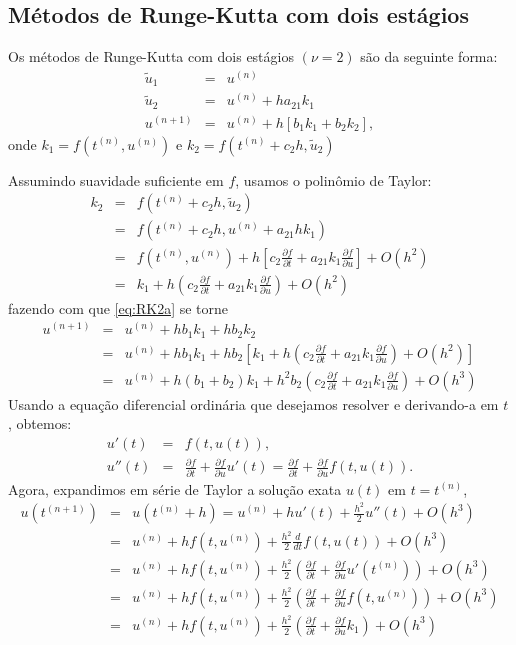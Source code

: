 \subsection{Métodos de Runge-Kutta com dois estágios}\label{eq:RK_2_subsec}
Os métodos de Runge-Kutta com dois estágios $\left(\nu=2\right)$ são da seguinte forma:
\begin{eqnarray}
  \tilde{u}_1 &=&u^{(n)} \\
  \tilde{u}_2 &=&u^{(n)}  + h a_{21}k_1 \\
  u^{(n+1)}&=&u^{(n)}  + h [ b_1k_1+b_2k_2],\label{eq:RK2a}
\end{eqnarray}
onde $k_1=f(t^{(n)},u^{(n)})$ e $k_2=f(t^{(n)}+c_2h,\tilde{u}_2)$

Assumindo suavidade suficiente em $f$, usamos o polinômio de Taylor:
\begin{eqnarray}
k_2 &=&f(t^{(n)}+c_2h, \tilde{u}_2)\\
   &=&f(t^{(n)}+c_2h, u^{(n)}+ a_{21}h k_1)\\
   &=&f(t^{(n)}, u^{(n)}) + h\left[c_2 \frac{\partial f}{\partial t}+ a_{21} k_1\frac{\partial f}{\partial u}\right]+O(h^2)\\
   &=&k_1 + h\left(c_2 \frac{\partial f}{\partial t}+ a_{21} k_1\frac{\partial f}{\partial u}\right)+O(h^2)
   \end{eqnarray}
fazendo com que \eqref{eq:RK2a} se torne
\begin{eqnarray}
  u^{(n+1)}&=&u^{(n)}   + h b_1 k_1 + hb_2k_2 \\
         &=&u^{(n)}  + h b_1 k_1 + hb_2\left[ k_1 + h\left(c_2 \frac{\partial f}{\partial t}+ a_{21} k_1\frac{\partial f}{\partial u}\right)+O(h^2)\right]\\
         &=&u^{(n)}  + h (b_1+b_2) k_1 + h^2 b_2\left(c_2 \frac{\partial f}{\partial t}+ a_{21} k_1\frac{\partial f}{\partial u}\right)+O(h^3)\label{eq:rk2_1}
\end{eqnarray}
Usando a equação diferencial ordinária que desejamos resolver e derivando-a em $t$, obtemos:
\begin{eqnarray}
  u'(t)    &=&f(t,u(t)),\\
  u''(t) &=&\frac{\partial f}{\partial t}+\frac{\partial f}{\partial u} u'(t) = \frac{\partial f}{\partial t} +\frac{\partial f}{\partial u} f(t,u(t)).
\end{eqnarray}
Agora,  expandimos em série de Taylor a solução exata $u(t)$ em $t=t^{(n)}$,
\begin{eqnarray}
  u(t^{(n+1)})&=&u(t^{(n)}+h)=u^{(n)}  + hu'(t) +\frac{h^2}{2} u''(t) + O(h^3)\\
            &=&u^{(n)}  + hf(t,u^{(n)}) +\frac{h^2}{2}\frac{d }{d t}f(t,u(t))+O(h^3)\\
	    &=&u^{(n)}  + hf(t,u^{(n)}) +\frac{h^2}{2}\left(\frac{\partial f}{\partial t}+\frac{\partial f}{\partial u}u'(t^{(n)})\right) +O(h^3)\\
           &=&u^{(n)}  + hf(t,u^{(n)}) +\frac{h^2}{2}\left(\frac{\partial f}{\partial t}+\frac{\partial f}{\partial u}f(t,u^{(n)})\right) +O(h^3)\\
           &=&u^{(n)}  + hf(t,u^{(n)}) +\frac{h^2}{2}\left(\frac{\partial f}{\partial t}+\frac{\partial f}{\partial u}k_1\right) +O(h^3)\label{eq:rk2_2}
           \end{eqnarray}
